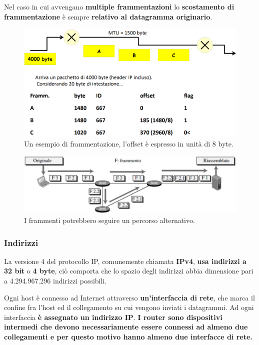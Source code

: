 \documentclass[11pt,a4paper,oneside]{book}
\theoremstyle{definition}
\begin{document}
\begin{itemize}
	      Nel caso in cui avvengano \textbf{multiple frammentazioni} lo \textbf{scostamento di frammentazione} è sempre \textbf{relativo al datagramma originario}.

	      \begin{figure}[!h]
		      \includegraphics[scale=0.33]{Immagini/Ip_frag.png}
		      \centering
		      \caption{Un esempio di frammentazione, l'offset è espresso in unità di 8 byte.}
	      \end{figure}

\end{itemize}

\pagebreak

\begin{figure}[!h]
	\includegraphics[scale=0.25]{Immagini/Ip_frag1.png}
	\centering
	\caption{I frammenti potrebbero seguire un percorso alternativo.}
\end{figure}

\subsubsection{Indirizzi}
La versione 4 del protocollo IP, comunemente chiamata \textbf{IPv4}, \textbf{usa indirizzi a 32 bit} o \textbf{4 byte}, ciò comporta che lo spazio degli indirizzi abbia dimensione pari a 4.294.967.296 indirizzi possibili.

Ogni host è connesso ad Internet attraverso \textbf{un'interfaccia di rete}, che marca il confine fra l'host ed il collegamento su cui vengono inviati i datagrammi. Ad ogni interfaccia \textbf{è assegnato un indirizzo IP}. \textbf{I router sono dispositivi intermedi che devono necessariamente essere connessi ad almeno due collegamenti e per questo motivo hanno almeno due interfacce di rete.}
\end{document}
